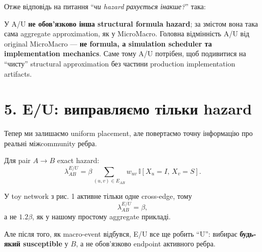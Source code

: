 \documentclass[11pt,a4paper]{article}
\newcommand{\I}{\mathbb{I}}
\begin{document}
Отже відповідь на питання ``\textit{чи hazard рахується інакше?}'' така:

\begin{tcolorbox}[colback=soft,colframe=macro,title=Коротка відповідь]
У A/U \textbf{не обов'язково інша structural formula hazard}; за змістом вона така сама aggregate approximation, як у MicroMacro. Головна відмінність A/U від original MicroMacro --- \textbf{не formula, а simulation scheduler та implementation mechanics}. Саме тому A/U потрібен, щоб подивитися на ``чисту'' structural approximation без частини production implementation artifacts.
\end{tcolorbox}

\section*{5. E/U: виправляємо тільки hazard}

Тепер ми залишаємо uniform placement, але повертаємо точну інформацію про реальні міжcommunity ребра.

Для pair $A\to B$ exact hazard:
\[
 \lambda^{E/U}_{AB}
 =\beta\sum_{(u,v)\in E_{AB}} w_{uv}\,\I[X_u=I,\,X_v=S].
\]

У toy network з рис. 1 активне тільки одне cross-edge, тому
\[
 \lambda^{E/U}_{AB}=\beta,
\]
а не $1.2\beta$, як у нашому простому aggregate прикладі.

Але після того, як macro-event відбувся, E/U все ще робить ``U'': вибирає \textbf{будь-який susceptible} у $B$, а не обов'язково endpoint активного ребра.
\end{document}
